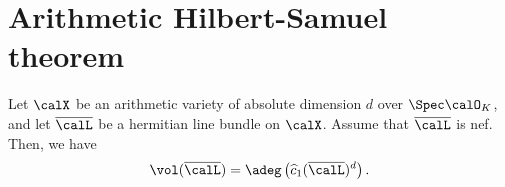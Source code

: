 \section{Arithmetic Hilbert-Samuel theorem}


    \begin{theorem}\label{thm:arithmetic_Hilbert_Samuel}
        Let \(\calX\) be an arithmetic variety of absolute dimension \(d\) over \(\Spec \calO_K\), 
        and let \(\overline{\calL}\) be a hermitian line bundle on \(\calX\). 
        Assume that \(\overline{\calL}\) is nef. 
        Then, we have
        \[
            \vol(\overline{\calL}) = \adeg\left( \widehat{c}_1(\overline{\calL})^d \right).
        \]
    \end{theorem}